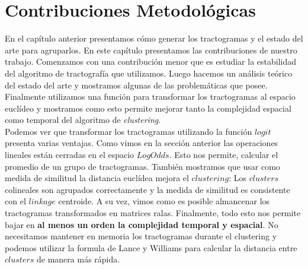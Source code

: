 \chapter{Contribuciones Metodol\'ogicas}

En el cap\'itulo anterior presentamos c\'omo generar los tractogramas y el 
estado del arte para agruparlos. En este cap\'itulo presentamos las contribuciones
de nuestro trabajo. Comenzamos con una contribuci\'on menor que es estudiar la 
estabilidad del algoritmo de tractograf\'ia que utilizamos. Luego hacemos
un an\'alisis te\'orico del estado del arte y mostramos algunas de las 
problem\'aticas que posee. Finalmente utilizamos una funci\'on para transformar
los tractogramas al espacio eucl\'ideo y mostramos como esto permite mejorar tanto
la complejidad espacial como temporal del algoritmo de \textit{clustering}. \\











Podemos ver que transformar los tractogramas utilizando la funci\'on $logit$
presenta varias ventajas. Como vimos en la secci\'on anterior las
operaciones lineales est\'an cerradas en el espacio $LogOdds$. Esto nos permite,
calcular el promedio de un grupo de tractogramas. Tambi\'en mostramos que usar 
como medida de similitud la distancia eucl\'idea mejora el $clustering$:
Los $clusters$ colineales son agrupados correctamente y la medida de similitud
es consistente con el $linkage$ centroide. A su vez, vimos como es posible 
almancenar los tractogramas transformados en matrices ralas. Finalmente, 
todo esto nos permite bajar en \textbf{al menos un orden la complejidad temporal
y espacial}. No necesitamos mantener en memoria los tractogramas durante el
clustering y podemos utilizar la formula de Lance y Williams para calcular la
distancia entre $clusters$ de manera m\'as r\'apida. \\
